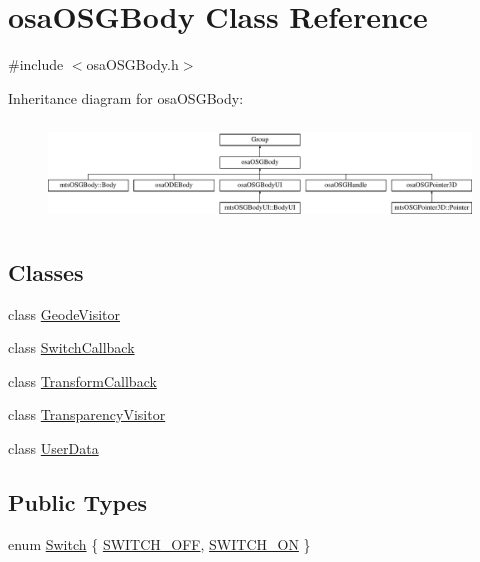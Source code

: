 \hypertarget{classosa_o_s_g_body}{\section{osa\-O\-S\-G\-Body Class Reference}
\label{classosa_o_s_g_body}
}


{\ttfamily \#include $<$osa\-O\-S\-G\-Body.\-h$>$}

Inheritance diagram for osa\-O\-S\-G\-Body\-:\begin{figure}[H]
\begin{center}
\leavevmode
\includegraphics[height=2.682635cm]{dc/d33/classosa_o_s_g_body}
\end{center}
\end{figure}
\subsection*{Classes}
\begin{DoxyCompactItemize}
\item 
class \hyperlink{classosa_o_s_g_body_1_1_geode_visitor}{Geode\-Visitor}
\item 
class \hyperlink{classosa_o_s_g_body_1_1_switch_callback}{Switch\-Callback}
\item 
class \hyperlink{classosa_o_s_g_body_1_1_transform_callback}{Transform\-Callback}
\item 
class \hyperlink{classosa_o_s_g_body_1_1_transparency_visitor}{Transparency\-Visitor}
\item 
class \hyperlink{classosa_o_s_g_body_1_1_user_data}{User\-Data}
\end{DoxyCompactItemize}
\subsection*{Public Types}
\begin{DoxyCompactItemize}
\item 
enum \hyperlink{classosa_o_s_g_body_a1820a6192991316ef8fdeb216538c370}{Switch} \{ \hyperlink{classosa_o_s_g_body_a1820a6192991316ef8fdeb216538c370ad9dd31dcffcf0953ed5d0f3395926afd}{S\-W\-I\-T\-C\-H\-\_\-\-O\-F\-F}, 
\hyperlink{classosa_o_s_g_body_a1820a6192991316ef8fdeb216538c370a35ca6cc64839a59fcc2091c704aa4f4b}{S\-W\-I\-T\-C\-H\-\_\-\-O\-N}
 \}
\end{DoxyCompactItemize}
